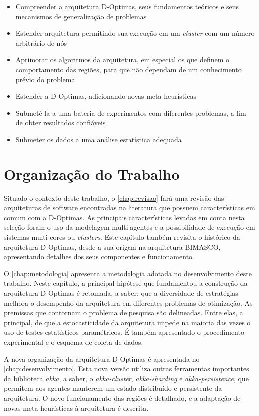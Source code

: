\begin{itemize}
    \item Compreender a arquitetura D-Optimas, seus fundamentos teóricos e seus mecanismos de generalização de problemas
    \item Estender arquitetura permitindo sua execução em um \textit{cluster} com um número arbitrário de nós
    \item Aprimorar os algoritmos da arquitetura, em especial os que definem o comportamento das regiões, para que não dependam de um conhecimento prévio do problema 
    \item Estender a D-Optimas, adicionando novas meta-heurísticas
    \item Submetê-la a uma bateria de experimentos com diferentes problemas, a fim de obter resultados confiáveis
    \item Submeter os dados a uma análise estatística adequada 
\end{itemize}

\section{Organização do Trabalho}

Situado o contexto deste trabalho, o \autoref{chap:revisao} fará uma revisão das arquiteturas de software encontradas na literatura que possuem características em comum com a D-Optimas. As principais características levadas em conta nesta seleção foram o uso da modelagem multi-agentes e a possibilidade de execução em sistemas multi-cores ou \textit{clusters}. Este capítulo também revisita o histórico da arquitetura D-Optimas, desde a sua origem na arquitetura BIMASCO, apresentando detalhes dos seus componentes e funcionamento. 

O \autoref{chap:metodologia} apresenta a metodologia adotada no desenvolvimento deste trabalho. Neste capítulo, a principal hipótese que fundamentou a construção da arquitetura D-Optimas é retomada, a saber: que a diversidade de estratégias melhora o desempenho da arquitetura em diferentes problemas de otimização. As premissas que contornam o problema de pesquisa são delineadas. Entre elas, a principal, de que a estocasticidade da arquitetura impede na maioria das vezes o uso de testes estatísticos paramétricos. É também apresentado o procedimento experimental e o esquema de coleta de dados.

A nova organização da arquitetura D-Optimas é apresentada no \autoref{chap:desenvolvimento}. Esta nova versão utiliza outras ferramentas importantes da biblioteca \textit{akka}, a saber, o \textit{akka-cluster}, \textit{akka-sharding} e \textit{akka-persistence}, que permitem aos agentes manterem um estado distribuído e persistente da arquitetura. O novo funcionamento das regiões é detalhado, e a adaptação de novas meta-heurísticas à arquitetura é descrita.

